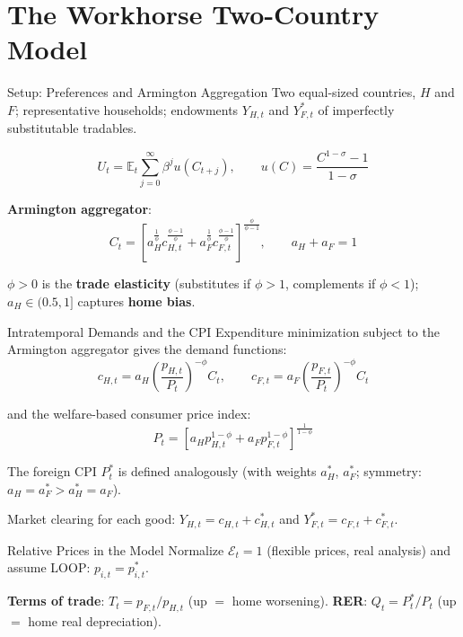 \documentclass[blue]{beamer}
\newcommand{\E}{\mathbb{E}}
\begin{document}
\section{The Workhorse Two-Country Model}

\begin{frame}{Setup: Preferences and Armington Aggregation}
Two equal-sized countries, $H$ and $F$; representative households; endowments $Y_{H,t}$ and $Y^*_{F,t}$ of imperfectly substitutable tradables.

\[
U_t = \E_t\sum_{j=0}^{\infty}\beta^j u(C_{t+j}), \qquad u(C) = \frac{C^{1-\sigma}-1}{1-\sigma}
\]

\textbf{Armington aggregator}:
\[
C_t = \left[a_H^{\frac{1}{\phi}}c_{H,t}^{\frac{\phi-1}{\phi}} + a_F^{\frac{1}{\phi}}c_{F,t}^{\frac{\phi-1}{\phi}}\right]^{\frac{\phi}{\phi-1}}, \qquad a_H + a_F = 1
\]

$\phi > 0$ is the \textbf{trade elasticity} (substitutes if $\phi > 1$, complements if $\phi < 1$); $a_H \in (0.5, 1]$ captures \textbf{home bias}.
\end{frame}

\begin{frame}{Intratemporal Demands and the CPI}
Expenditure minimization subject to the Armington aggregator gives the demand functions:
\[
c_{H,t} = a_H\left(\frac{p_{H,t}}{P_t}\right)^{-\phi}C_t, \qquad c_{F,t} = a_F\left(\frac{p_{F,t}}{P_t}\right)^{-\phi}C_t
\]

and the welfare-based consumer price index:
\[
P_t = \left[a_H p_{H,t}^{1-\phi} + a_F p_{F,t}^{1-\phi}\right]^{\frac{1}{1-\phi}}
\]

The foreign CPI $P_t^*$ is defined analogously (with weights $a_H^*$, $a_F^*$; symmetry: $a_H = a_F^* > a_H^* = a_F$).

\bigskip
Market clearing for each good: $Y_{H,t} = c_{H,t} + c^*_{H,t}$ and $Y^*_{F,t} = c_{F,t} + c^*_{F,t}$.
\end{frame}

\begin{frame}{Relative Prices in the Model}
Normalize $\mathcal{E}_t = 1$ (flexible prices, real analysis) and assume LOOP: $p_{i,t} = p^*_{i,t}$.

\bigskip
\textbf{Terms of trade}: $T_t = p_{F,t}/p_{H,t}$ (up $=$ home worsening). \textbf{RER}: $Q_t = P_t^*/P_t$ (up $=$ home real depreciation).

\end{frame}
\end{document}
